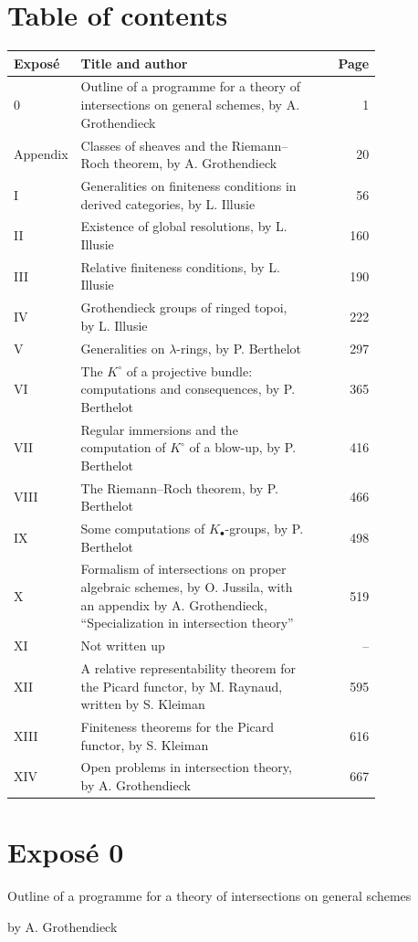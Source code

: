 \section*{Table of contents}
\begin{longtable}{@{}p{0.16\linewidth}p{0.64\linewidth}r@{}}
\toprule
Exposé & Title and author & Page \\
\midrule
0 & Outline of a programme for a theory of intersections on general schemes, by A. Grothendieck & 1 \\
Appendix & Classes of sheaves and the Riemann--Roch theorem, by A. Grothendieck & 20 \\
I & Generalities on finiteness conditions in derived categories, by L. Illusie & 56 \\
II & Existence of global resolutions, by L. Illusie & 160 \\
III & Relative finiteness conditions, by L. Illusie & 190 \\
IV & Grothendieck groups of ringed topoi, by L. Illusie & 222 \\
V & Generalities on $\lambda$-rings, by P. Berthelot & 297 \\
VI & The $K^\circ$ of a projective bundle: computations and consequences, by P. Berthelot & 365 \\
VII & Regular immersions and the computation of $K^\circ$ of a blow-up, by P. Berthelot & 416 \\
VIII & The Riemann--Roch theorem, by P. Berthelot & 466 \\
IX & Some computations of $K_\bullet$-groups, by P. Berthelot & 498 \\
X & Formalism of intersections on proper algebraic schemes, by O. Jussila, with an appendix by A. Grothendieck, ``Specialization in intersection theory'' & 519 \\
XI & Not written up & -- \\
XII & A relative representability theorem for the Picard functor, by M. Raynaud, written by S. Kleiman & 595 \\
XIII & Finiteness theorems for the Picard functor, by S. Kleiman & 616 \\
XIV & Open problems in intersection theory, by A. Grothendieck & 667 \\
\bottomrule
\end{longtable}

\section*{Exposé 0}
\begin{center}
{\large Outline of a programme for a theory of intersections on general schemes}\par
by A. Grothendieck
\end{center}

